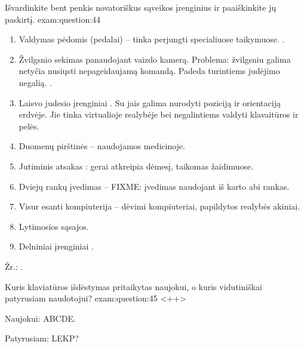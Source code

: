 \begin{question}{%
  Išvardinkite bent penkis novatoriškus sąveikos įrenginius ir
  paaiškinkite jų paskirtį.
  }{exam:question:44}
  \begin{enumerate}
    \item Valdymas pėdomis (pedalai) – tinka perjungti specialiuose
      taikymuose. \cite[43]{skaidres-16}.
    \item Žvilgsnio sekimas  panaudojant vaizdo kamerą.
      Problema: žvilgsniu galima netyčia nusiųsti nepageidaujamą komandą.
      Padeda turintiems judėjimo negalią. \cite[44]{skaidres-16}.
    \item Laisvo judesio įrenginiai . Su jais galima nurodyti poziciją ir orientaciją erdvėje.
      Jie tinka virtualioje realybėje bei negalintiems valdyti klavaitūros
      ir pelės.
    \item Duomenų pirštinės  – naudojamos medicinoje.
    \item Jutiminis atsakas : gerai atkreipia
      dėmesį, taikomas žaidimuose.
    \item Dviejų rankų įvedimas  – FIXME:
      įvedimas naudojant iš karto abi rankas.
    \item Visur esanti kompiuterija  –
      dėvimi kompiuteriai, papildytos realybės akiniai.
    \item Lytimosios  sąsajos.
    \item Delniniai įrenginiai .
  \end{enumerate}
  Žr.: \cite[42]{skaidres-16}.
\end{question}

\begin{question}{%
  Kuris klaviatūros išdėstymas pritaikytas naujokui, o kuris vidutiniškai
  patyrusiam naudotojui?
  }{exam:question:45}
  <++>

  Naujokui: ABCDE.\cite[10]{skaidres-16}

  Patyrusiam: LEKP?

\end{question}

